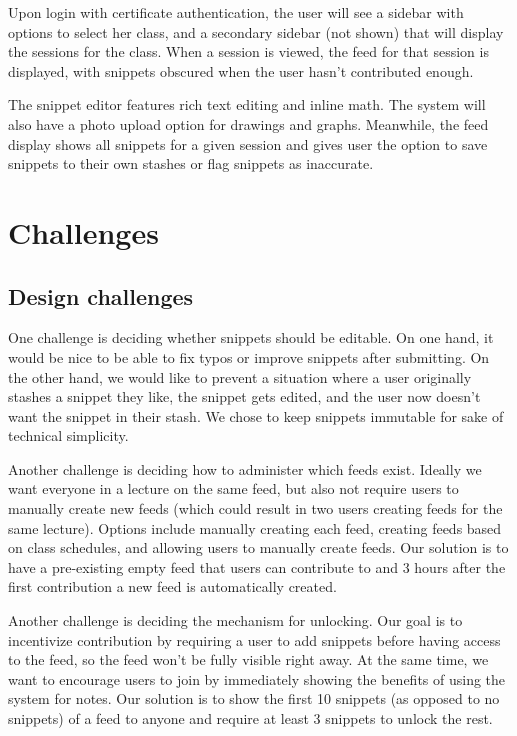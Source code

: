 \documentclass{article}
\begin{document}
\newpage
Upon login with certificate authentication, the user will see a sidebar with options to select her class, and a secondary sidebar (not shown) that will display the sessions for the class. When a session is viewed, the feed for that session is displayed, with snippets obscured when the user hasn't contributed enough.

The snippet editor features rich text editing and inline math. The system will also have a photo upload option for drawings and graphs. Meanwhile, the feed display shows all snippets for a given session and gives user the option to save snippets to their own stashes or flag snippets as inaccurate.

\section*{Challenges}
\subsection*{Design challenges}
One challenge is deciding whether snippets should be editable. On one hand, it would be nice to be able to fix typos or improve snippets after submitting. On the other hand, we would like to prevent a situation where a user originally stashes a snippet they like, the snippet gets edited, and the user now doesn't want the snippet in their stash. We chose to keep snippets immutable for sake of technical simplicity.

Another challenge is deciding how to administer which feeds exist. Ideally we want everyone in a lecture on the same feed, but also not require users to manually create new feeds (which could result in two users creating feeds for the same lecture). Options include manually creating each feed, creating feeds based on class schedules, and allowing users to manually create feeds. Our solution is to have a pre-existing empty feed that users can contribute to and 3 hours after the first contribution a new feed is automatically created.

Another challenge is deciding the mechanism for unlocking. Our goal is to incentivize contribution by requiring a user to add snippets before having access to the feed, so the feed won't be fully visible right away. At the same time, we want to encourage users to join by immediately showing the benefits of using the system for notes. Our solution is to show the first 10 snippets (as opposed to no snippets) of a feed to anyone and require at least 3 snippets to unlock the rest.
\end{document}
